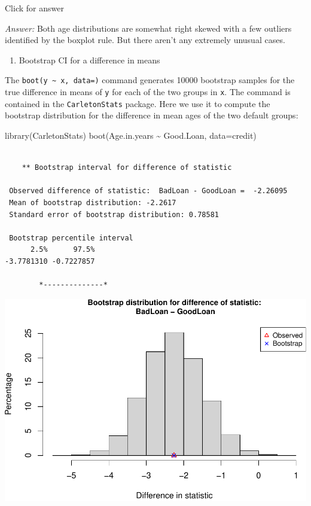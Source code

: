 \documentclass[
]{book}
\newenvironment{Shaded}{\begin{snugshade}}{\end{snugshade}}
\newcommand{\AttributeTok}[1]{\textcolor[rgb]{0.77,0.63,0.00}{#1}}
\newcommand{\FunctionTok}[1]{\textcolor[rgb]{0.00,0.00,0.00}{#1}}
\newcommand{\NormalTok}[1]{#1}
\newcommand{\SpecialCharTok}[1]{\textcolor[rgb]{0.00,0.00,0.00}{#1}}
\providecommand{\tightlist}{%
  \setlength{\itemsep}{0pt}\setlength{\parskip}{0pt}}
\begin{document}
Click for answer

\emph{Answer:} Both age distributions are somewhat right skewed with a few outliers identified by the boxplot rule. But there aren't any extremely unusual cases.

\begin{enumerate}
\def\labelenumi{(\alph{enumi})}
\setcounter{enumi}{1}
\tightlist
\item
  Bootstrap CI for a difference in means
\end{enumerate}

The \texttt{boot(y\ \textasciitilde{}\ x,\ data=)} command generates 10000 bootstrap samples for the true difference in means of \texttt{y} for each of the two groups in \texttt{x}. The command is contained in the \texttt{CarletonStats} package. Here we use it to compute the bootstrap distribution for the difference in mean ages of the two default groups:

\begin{Shaded}
\begin{Highlighting}[]
\FunctionTok{library}\NormalTok{(CarletonStats)}
\FunctionTok{boot}\NormalTok{(Age.in.years }\SpecialCharTok{\textasciitilde{}}\NormalTok{ Good.Loan, }\AttributeTok{data=}\NormalTok{credit)}
\end{Highlighting}
\end{Shaded}

\begin{verbatim}

    ** Bootstrap interval for difference of statistic

 Observed difference of statistic:  BadLoan - GoodLoan =  -2.26095 
 Mean of bootstrap distribution: -2.2617 
 Standard error of bootstrap distribution: 0.78581 

 Bootstrap percentile interval
      2.5%      97.5% 
-3.7781310 -0.7227857 

        *--------------*
\end{verbatim}

\includegraphics[width=1\linewidth]{Class_Activity_8_files/figure-latex/unnamed-chunk-10-1}
\end{document}
